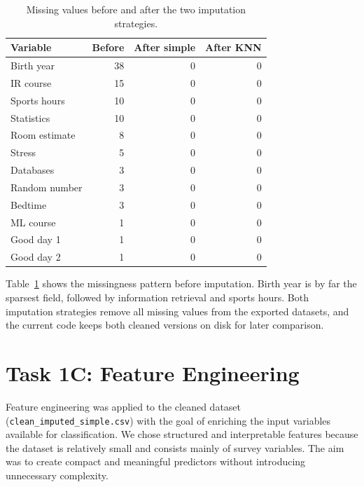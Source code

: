 \documentclass[runningheads]{llncs}
\begin{document}
\begin{table}
\caption{Missing values before and after the two imputation strategies.}
\label{tab:missing}
\centering
\begin{tabular}{|l|r|r|r|}
\hline
Variable & Before & After simple & After KNN \\
\hline
Birth year & 38 & 0 & 0 \\
IR course & 15 & 0 & 0 \\
Sports hours & 10 & 0 & 0 \\
Statistics & 10 & 0 & 0 \\
Room estimate & 8 & 0 & 0 \\
Stress & 5 & 0 & 0 \\
Databases & 3 & 0 & 0 \\
Random number & 3 & 0 & 0 \\
Bedtime & 3 & 0 & 0 \\
ML course & 1 & 0 & 0 \\
Good day 1 & 1 & 0 & 0 \\
Good day 2 & 1 & 0 & 0 \\
\hline
\end{tabular}
\end{table}

Table~\ref{tab:missing} shows the missingness pattern before imputation. Birth year is by far the sparsest field, followed by information retrieval and sports hours. Both imputation strategies remove all missing values from the exported datasets, and the current code keeps both cleaned versions on disk for later comparison.

\section{Task 1C: Feature Engineering}

Feature engineering was applied to the cleaned dataset (\texttt{clean\_imputed\_simple.csv}) with the goal of enriching the input variables available for classification. We chose structured and interpretable features because the dataset is relatively small and consists mainly of survey variables. The aim was to create compact and meaningful predictors without introducing unnecessary complexity.
\end{document}
